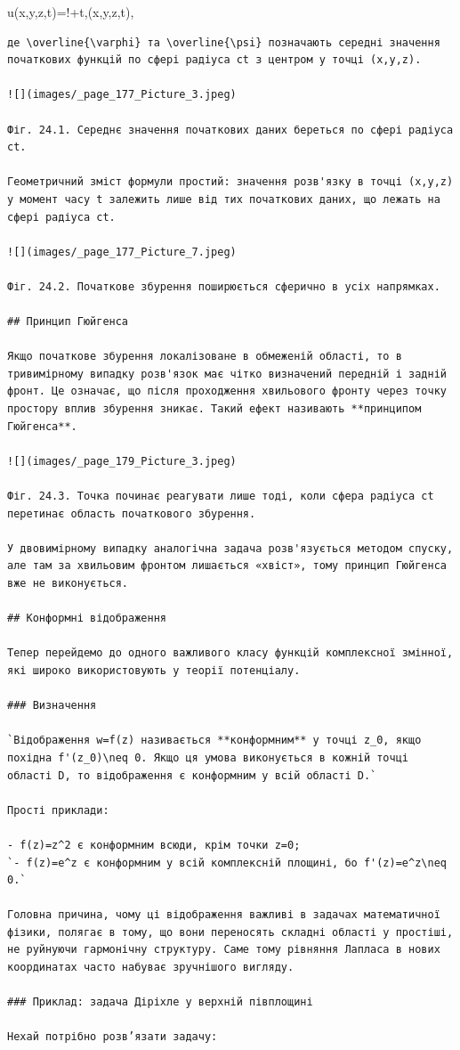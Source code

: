 \documentclass[
  ukrainian,
]{article}
\begin{document}
u(x,y,z,t)=!+t,\overline{\psi}(x,y,z,t),

\begin{verbatim}
де \overline{\varphi} та \overline{\psi} позначають середні значення початкових функцій по сфері радіуса ct з центром у точці (x,y,z).

![](images/_page_177_Picture_3.jpeg)

Фіг. 24.1. Середнє значення початкових даних береться по сфері радіуса ct.

Геометричний зміст формули простий: значення розв'язку в точці (x,y,z) у момент часу t залежить лише від тих початкових даних, що лежать на сфері радіуса ct.

![](images/_page_177_Picture_7.jpeg)

Фіг. 24.2. Початкове збурення поширюється сферично в усіх напрямках.

## Принцип Гюйгенса

Якщо початкове збурення локалізоване в обмеженій області, то в тривимірному випадку розв'язок має чітко визначений передній і задній фронт. Це означає, що після проходження хвильового фронту через точку простору вплив збурення зникає. Такий ефект називають **принципом Гюйгенса**.

![](images/_page_179_Picture_3.jpeg)

Фіг. 24.3. Точка починає реагувати лише тоді, коли сфера радіуса ct перетинає область початкового збурення.

У двовимірному випадку аналогічна задача розв'язується методом спуску, але там за хвильовим фронтом лишається «хвіст», тому принцип Гюйгенса вже не виконується.

## Конформні відображення

Тепер перейдемо до одного важливого класу функцій комплексної змінної, які широко використовують у теорії потенціалу.

### Визначення

`Відображення w=f(z) називається **конформним** у точці z_0, якщо похідна f'(z_0)\neq 0. Якщо ця умова виконується в кожній точці області D, то відображення є конформним у всій області D.`

Прості приклади:

- f(z)=z^2 є конформним всюди, крім точки z=0;
`- f(z)=e^z є конформним у всій комплексній площині, бо f'(z)=e^z\neq 0.`

Головна причина, чому ці відображення важливі в задачах математичної фізики, полягає в тому, що вони переносять складні області у простіші, не руйнуючи гармонічну структуру. Саме тому рівняння Лапласа в нових координатах часто набуває зручнішого вигляду.

### Приклад: задача Діріхле у верхній півплощині

Нехай потрібно розв’язати задачу:
\end{verbatim}
\end{document}

